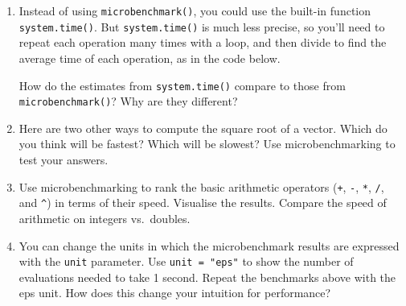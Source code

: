 \begin{enumerate}
\def\labelenumi{\arabic{enumi}.}
\item
  Instead of using \texttt{microbenchmark()}, you could use the built-in
  function \texttt{system.time()}. But \texttt{system.time()} is much
  less precise, so you'll need to repeat each operation many times with
  a loop, and then divide to find the average time of each operation, as
  in the code below.

\begin{Shaded}
\begin{Highlighting}[]
\StringTok{ }\NormalTok{:}
\StringTok{ }
\StringTok{ }\NormalTok{) /}\StringTok{ }
\end{Highlighting}
\end{Shaded}

  How do the estimates from \texttt{system.time()} compare to those from
  \texttt{microbenchmark()}? Why are they different?
\item
  Here are two other ways to compute the square root of a vector. Which
  do you think will be fastest? Which will be slowest? Use
  microbenchmarking to test your answers.

\begin{Shaded}
\begin{Highlighting}[]
\StringTok{ }\NormalTok{(} \NormalTok{/}\StringTok{ }\NormalTok{)}
\NormalTok{(}\StringTok{ }\NormalTok{)}
\end{Highlighting}
\end{Shaded}
\item
  Use microbenchmarking to rank the basic arithmetic operators
  (\texttt{+}, \texttt{-}, \texttt{*}, \texttt{/}, and \texttt{\^{}}) in
  terms of their speed. Visualise the results. Compare the speed of
  arithmetic on integers vs.~doubles.
\item
  You can change the units in which the microbenchmark results are
  expressed with the \texttt{unit} parameter. Use \texttt{unit = "eps"}
  to show the number of evaluations needed to take 1 second. Repeat the
  benchmarks above with the eps unit. How does this change your
  intuition for performance?
\end{enumerate}

